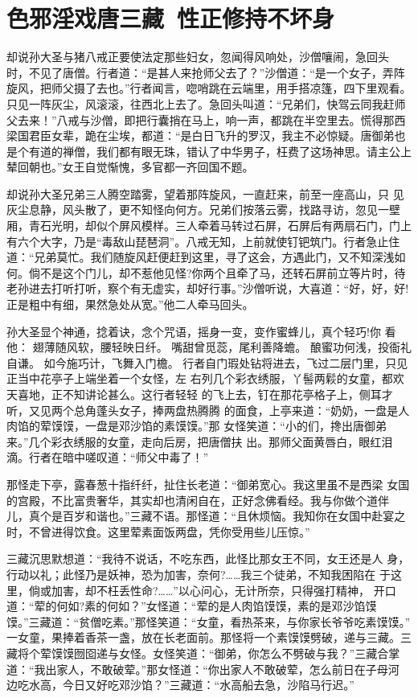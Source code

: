 \chapter{色邪淫戏唐三藏~性正修持不坏身}

却说孙大圣与猪八戒正要使法定那些妇女，忽闻得风响处，沙僧嚷闹，急回头
时，不见了唐僧。行者道：“是甚人来抢师父去了？”沙僧道：“是一个女子，弄阵
旋风，把师父摄了去也。”行者闻言，唿哨跳在云端里，用手搭凉篷，四下里观看。
只见一阵灰尘，风滚滚，往西北上去了。急回头叫道：“兄弟们，快驾云同我赶师
父去来！”八戒与沙僧，即把行囊捎在马上，响一声，都跳在半空里去。慌得那西
梁国君臣女辈，跪在尘埃，都道：“是白日飞升的罗汉，我主不必惊疑。唐御弟也
是个有道的禅僧，我们都有眼无珠，错认了中华男子，枉费了这场神思。请主公上
辇回朝也。”女王自觉惭愧，多官都一齐回国不题。

却说孙大圣兄弟三人腾空踏雾，望着那阵旋风，一直赶来，前至一座高山，只
见灰尘息静，风头散了，更不知怪向何方。兄弟们按落云雾，找路寻访，忽见一壁
厢，青石光明，却似个屏风模样。三人牵着马转过石屏，石屏后有两扇石门，门上
有六个大字，乃是“毒敌山琵琶洞”。八戒无知，上前就使钉钯筑门。行者急止住
道：“兄弟莫忙。我们随旋风赶便赶到这里，寻了这会，方遇此门，又不知深浅如
何。倘不是这个门儿，却不惹他见怪?你两个且牵了马，还转石屏前立等片时，待
老孙进去打听打听，察个有无虚实，却好行事。”沙僧听说，大喜道：“好，好，好!
正是粗中有细，果然急处从宽。”他二人牵马回头。

孙大圣显个神通，捻着诀，念个咒语，摇身一变，变作蜜蜂儿，真个轻巧!你
看他：
翅薄随风软，腰轻映日纤。
嘴甜曾觅蕊，尾利善降蟾。
酿蜜功何浅，投衙礼自谦。
如今施巧计，飞舞入门檐。
行者自门瑕处钻将进去，飞过二层门里，只见正当中花亭子上端坐着一个女怪，左
右列几个彩衣绣服，丫髻两鬏的女童，都欢天喜地，正不知讲论甚么。这行者轻轻
的飞上去，钉在那花亭格子上，侧耳才听，又见两个总角蓬头女子，捧两盘热腾腾
的面食，上亭来道：“奶奶，一盘是人肉馅的荤馍馍，一盘是邓沙馅的素馍馍。”那
女怪笑道：“小的们，搀出唐御弟来。”几个彩衣绣服的女童，走向后房，把唐僧扶
出。那师父面黄唇白，眼红泪滴。行者在暗中嗟叹道：“师父中毒了！”

那怪走下亭，露春葱十指纤纤，扯住长老道：“御弟宽心。我这里虽不是西梁
女国的宫殿，不比富贵奢华，其实却也清闲自在，正好念佛看经。我与你做个道伴
儿，真个是百岁和谐也。”三藏不语。那怪道：“且休烦恼。我知你在女国中赴宴之
时，不曾进得饮食。这里荤素面饭两盘，凭你受用些儿压惊。”

三藏沉思默想道：“我待不说话，不吃东西，此怪比那女王不同，女王还是人
身，行动以礼；此怪乃是妖神，恐为加害，奈何?……我三个徒弟，不知我困陷在
于这里，倘或加害，却不枉丢性命?……”以心问心，无计所奈，只得强打精神，
开口道：“荤的何如?素的何如？”女怪道：“荤的是人肉馅馍馍，素的是邓沙馅馍
馍。”三藏道：“贫僧吃素。”那怪笑道：“女童，看热茶来，与你家长爷爷吃素馍馍。”
一女童，果捧着香茶一盏，放在长老面前。那怪将一个素馍馍劈破，递与三藏。三
藏将个荤馍馍囫囵递与女怪。女怪笑道：“御弟，你怎么不劈破与我？”三藏合掌
道：“我出家人，不敢破荤。”那女怪道：“你出家人不敢破荤，怎么前日在子母河
边吃水高，今日又好吃邓沙馅？”三藏道：“水高船去急，沙陷马行迟。”

